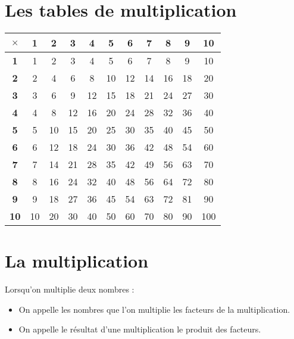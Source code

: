 \begin{pageCours} 

\section{Les tables de multiplication}

\begin{center}
\begin{tabular}{c||c|c|c|c|c|c|c|c|c|c}
\textbf{$\times$} & \textbf{1} & \textbf{2} & \textbf{3} & \textbf{4} & \textbf{5} & \textbf{6} & \textbf{7} & \textbf{8} & \textbf{9} & \textbf{10} \\\hline\hline
\textbf{1} & 1 & 2 & 3 & 4 & 5 & 6 & 7 & 8 & 9 & 10 \\\hline
\textbf{2} & 2 & 4 & 6 & 8 & 10 & 12 & 14 & 16 & 18 & 20 \\\hline
\textbf{3} & 3 & 6 & 9 & 12 & 15 & 18 & 21 & 24 & 27 & 30 \\\hline
\textbf{4} & 4 & 8 & 12 & 16 & 20 & 24 & 28 & 32 & 36 & 40 \\\hline
\textbf{5} & 5 & 10 & 15 & 20 & 25 & 30 & 35 & 40 & 45 & 50 \\\hline
\textbf{6} & 6 & 12 & 18 & 24 & 30 & 36 & 42 & 48 & 54 & 60 \\\hline
\textbf{7} & 7 & 14 & 21 & 28 & 35 & 42 & 49 & 56 & 63 & 70 \\\hline
\textbf{8} & 8 & 16 & 24 & 32 & 40 & 48 & 56 & 64 & 72 & 80 \\\hline
\textbf{9} & 9 & 18 & 27 & 36 & 45 & 54 & 63 & 72 & 81 & 90 \\\hline
\textbf{10} & 10 & 20 & 30 & 40 & 50 & 60 & 70 & 80 & 90 & 100 \\
\end{tabular}
\end{center}

\section{La multiplication}

\begin{Voc}
Lorsqu'on multiplie deux nombres :
\begin{itemize}
\item On appelle les nombres que l’on multiplie les facteurs de la multiplication.
\item On appelle le résultat d’une multiplication le produit des facteurs.
\end{itemize}
\end{Voc}


\end{pageCours}
